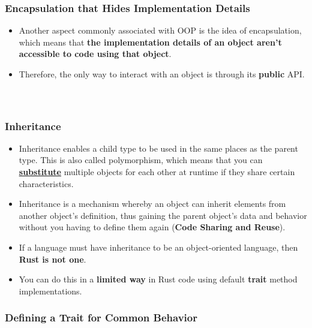 \documentclass{beamer}
\begin{document}
\begin{frame}[fragile]
	\frametitle{Encapsulation that Hides Implementation Details}
	
	\begin{itemize}
		\item 	Another aspect commonly associated with OOP is the idea of encapsulation, which means that \textbf{the implementation details of an object aren’t accessible to code using that object}.
		\item  Therefore, the only way to interact with an object is through its \textbf{public} API.
	\end{itemize}

\begin{columns}
	\inputminted[fontsize=\scriptsize]{rust}{./code/oop1.rs}
	\inputminted[firstnumber=6, fontsize=\scriptsize]{rust}{./code/oop2.rs}
\end{columns}

\end{frame}

	
	\begin{frame}[fragile]
		\frametitle{Inheritance}
		
		\begin{itemize}
			\item Inheritance enables a child type to be used in the same places as the parent type. This is also called polymorphism, which means that you can \href{https://en.wikipedia.org/wiki/Liskov_substitution_principle}{\textbf{\underline{substitute}}} multiple objects for each other at runtime if they share certain characteristics.
			\item 	Inheritance is a mechanism whereby an object can inherit elements from another object’s definition, thus gaining the parent object’s data and behavior without you having to define them again (\textbf{Code Sharing and Reuse}).
		
				\item 	If a language must have inheritance to be an object-oriented language, then \textbf{Rust is not one}.
				\item 	You can do this in a \textbf{limited way} in Rust code using default \textbf{trait} method implementations.
			
			
		\end{itemize}
	\end{frame}
	
	
	
	\begin{frame}[fragile]
		\frametitle{Defining a Trait for Common Behavior}
		\inputminted[fontsize=\scriptsize]{rust}{./code/oop3.rs}
	\end{frame}
\end{document}
